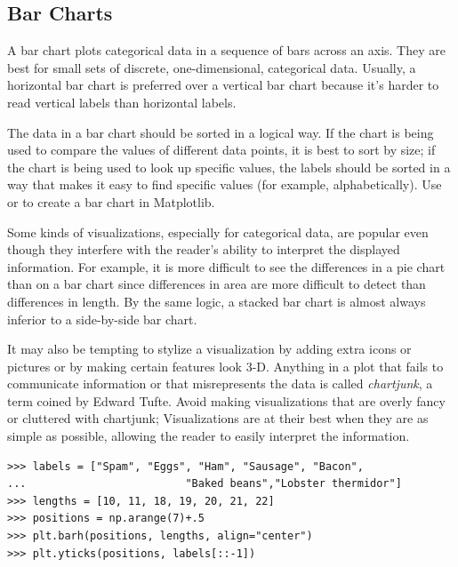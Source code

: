 \subsection*{Bar Charts} %

A bar chart plots categorical data in a sequence of bars across an axis.
They are best for small sets of discrete, one-dimensional, categorical data.
Usually, a horizontal bar chart is preferred over a vertical bar chart because it's harder to read vertical labels than horizontal labels.

The data in a bar chart should be sorted in a logical way.
If the chart is being used to compare the values of different data points, it is best to sort by size; if the chart is being used to look up specific values, the labels should be sorted in a way that makes it easy to find specific values (for example, alphabetically).
Use  or  to create a bar chart in Matplotlib.


Some kinds of visualizations, especially for categorical data, are popular even though they interfere with the reader's ability to interpret the displayed information.
For example, it is more difficult to see the differences in a pie chart than on a bar chart since differences in area are more difficult to detect than differences in length.
By the same logic, a stacked bar chart is almost always inferior to a side-by-side bar chart.

It may also be tempting to stylize a visualization by adding extra icons or pictures or by making certain features look 3-D.
Anything in a plot that fails to communicate information or that misrepresents the data is called \emph{chartjunk}, a term coined by Edward Tufte.
Avoid making visualizations that are overly fancy or cluttered with chartjunk;
Visualizations are at their best when they are as simple as possible, allowing the reader to easily interpret the information.

\begin{lstlisting}
>>> labels = ["Spam", "Eggs", "Ham", "Sausage", "Bacon",
...                         "Baked beans","Lobster thermidor"]
>>> lengths = [10, 11, 18, 19, 20, 21, 22]
>>> positions = np.arange(7)+.5
>>> plt.barh(positions, lengths, align="center")
>>> plt.yticks(positions, labels[::-1])
\end{lstlisting}

